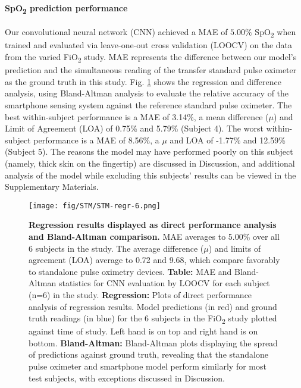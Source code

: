 \documentclass[12pt]{article}
\begin{document}
\paragraph*{SpO\textsubscript{2} prediction performance}
Our convolutional neural network (CNN) achieved a MAE of $5.00\%$ SpO\textsubscript{2} when trained and evaluated via leave-one-out cross validation (LOOCV) on the data from the varied FiO\textsubscript{2} study. MAE represents the difference between our model's prediction and the simultaneous reading of the transfer standard pulse oximeter as the ground truth in this study.  Fig. \ref{reg-ba} shows the regression and difference analysis, using Bland-Altman analysis to evaluate the relative accuracy of the smartphone sensing system against the reference standard pulse oximeter. The best within-subject performance is
a MAE of 3.14\%, a mean difference ($\mu$) and Limit of Agreement (LOA) of 0.75\% and 5.79\% (Subject 4). 
The worst within-subject performance is a MAE of 8.56\%, a $\mu$ and LOA of -1.77\% and 12.59\% (Subject 5).  The reasons the model may have performed poorly on this subject (namely, thick skin on the fingertip) are discussed in Discussion, and additional analysis of the model while excluding this subjects' results can be viewed in the Supplementary Materials.

\begin{figure}[ht!]
\texttt{[image: fig/STM/STM-regr-6.png]}
\caption{\textbf{Regression results displayed as direct performance analysis and Bland-Altman comparison.} MAE averages to 5.00\% over all 6 subjects in the study.  The average difference ($\mu$) and limits of agreement (LOA) average to 0.72 and 9.68, which compare favorably to standalone pulse oximetry devices. \textbf{Table:} MAE and Bland-Altman statistics for CNN evaluation by LOOCV for each subject (n=6) in the study. \textbf{Regression:} Plots of direct performance analysis of regression results.  Model predictions (in red) and ground truth readings (in blue) for the 6 subjects in the FiO\textsubscript{2} study plotted against time of study.  Left hand is on top and right hand is on bottom. \textbf{Bland-Altman:} Bland-Altman plots displaying the spread of predictions against ground truth, revealing that the standalone pulse oximeter and smartphone model perform similarly for most test subjects, with exceptions
discussed in Discussion.}
\label{reg-ba}
\end{figure}
\end{document}
